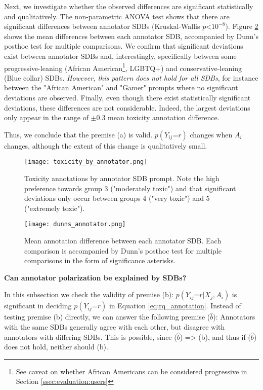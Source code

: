 Next, we investigate whether the observed differences are significant statistically and qualitatively. The non-parametric ANOVA test shows that there are significant differences between annotator \acp{SDB} (Kruskal-Wallis $p\text{<}10^{-8}$). Figure \ref{fig::toxicity-annotator-significance} shows the mean differences between each annotator \ac{SDB}, accompanied by Dunn's posthoc test for multiple comparisons. We confirm that significant deviations exist between annotator \acp{SDB} and, interestingly, specifically between some progressive-leaning (African American\footnote{See caveat on whether African Americans can be considered progressive in Section \ref{ssec:evaluation:users}}, LGBTQ+) and conservative-leaning (Blue collar) \acp{SDB}. \textit{However, this pattern does not hold for all \acp{SDB}}, for instance between the "African American" and "Gamer" prompts where no significant deviations are observed. Finally, even though there exist statistically significant deviations, these differences are not considerable. Indeed, the largest deviations only appear in the range of $\pm 0.3$ mean toxicity annotation difference.

Thus, we conclude that the premise (a) is valid. $p(Y_{ij} \text{=} r)$ changes when $A_i$ changes, although the extent of this change is qualitatively small.

\begin{figure}
	\centering
	\texttt{[image: toxicity\_by\_annotator.png]}
	\caption{Toxicity annotations by annotator \ac{SDB} prompt. Note the high preference towards group 3 ("moderately toxic") and that significant deviations only occur between groups 4 ("very toxic") and 5 ("extremely toxic").}
	\label{fig::toxicity-annotator}
\end{figure}

\begin{figure}
	\centering
	\texttt{[image: dunns\_annotator.png]}
	\caption{Mean annotation difference between each annotator \ac{SDB}. Each comparison is accompanied by Dunn's posthoc test for multiple comparisons in the form of significance asterisks.}
	\label{fig::toxicity-annotator-significance}
\end{figure}

\textbf{Can annotator polarization be explained by SDBs?}

In this subsection we check the validity of premise (b): $p(Y_{ij} \text{=} r | X_j, A_i)$ is significant in deciding $p(Y_{ij} \text{=} r)$ in Equation \ref{eq:rq_annotation}. Instead of testing premise (b) directly, we can answer the following premise ($\hat{b}$): Annotators with the same \acp{SDB} generally agree with each other, but disagree with annotators with differing \acp{SDB}. This is possible, since ($\hat{b}$) => (b), and thus if ($\hat{b}$) does not hold, neither should (b).


